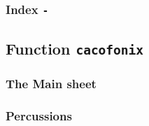 \documentclass{article}
\begin{document}
\subsubsection{Index \lstinline!-!}
\label{sec:Index}

\subsection{Function \lstinline!cacofonix!}
\label{sec:CacofonixFunction}

\subsubsection{The Main sheet}
\label{sec:MainSheet}

\subsubsection{Percussions}
\label{sec:Percussions}
\end{document}
